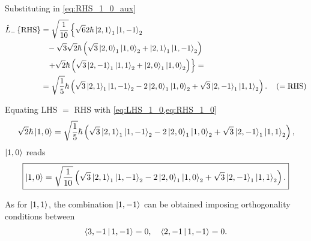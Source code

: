Substituting in \cref{eq:RHS_1_0_aux}
\begin{align}\label{eq:RHS_1_0}
    \notag
    \hat{L}_{-} \left\{ \text{RHS} \right\} &=
    \sqrt{\frac{1}{10}} \left\{
        \sqrt{6} 
        2 \hbar \Ket{2,1}_1 \Ket{1,-1}_2
        \right. \\
        \notag
        & \phantom{=}
        -\sqrt{3} 
        \sqrt{2} \hbar \left(
            \sqrt{3} \Ket{2,0}_1 \Ket{1,0}_2
            +
            \Ket{2,1}_1 \Ket{1,-1}_2
        \right)
        \\
        \notag
        & \phantom{=} \left.
        + 
        \sqrt{2} \hbar \left(
            \sqrt{3} \Ket{2,-1}_1 \Ket{1,1}_2
            +
            \Ket{2,0}_1 \Ket{1,0}_2
        \right)
    \right\}
    =
    \\
    &=
    \sqrt{\frac{1}{5}} \hbar \left(
        \sqrt{3} \Ket{2,1}_1 \Ket{1,-1}_2
        - 2 \Ket{2,0}_1 \Ket{1,0}_2 
        + \sqrt{3} \Ket{2,-1}_1 \Ket{1,1}_2
    \right).
    \quad \left( = \text{RHS} \right)
\end{align}

Equating LHS $=$ RHS with \cref{eq:LHS_1_0,eq:RHS_1_0} 
\begin{equation}
    \sqrt{2} \hbar \Ket{1,0} =
    \sqrt{\frac{1}{5}} \hbar \left(
        \sqrt{3} \Ket{2,1}_1 \Ket{1,-1}_2
        - 2 \Ket{2,0}_1 \Ket{1,0}_2 
        + \sqrt{3} \Ket{2,-1}_1 \Ket{1,1}_2
    \right),
\end{equation}
$\Ket{1,0}$ reads 
\begin{equation}
    \boxed{
        \Ket{1,0} =
        \sqrt{\frac{1}{10}} \left(
            \sqrt{3} \Ket{2,1}_1 \Ket{1,-1}_2
            - 2 \Ket{2,0}_1 \Ket{1,0}_2 
            + \sqrt{3} \Ket{2,-1}_1 \Ket{1,1}_2
        \right)
        .
    }
\end{equation}

As for $\Ket{1,1}$, the combination $\Ket{1,-1}$ can be obtained imposing orthogonality conditions between 
\begin{equation}\label{eq:orthog_cond_1_-1}
    \Braket{3,-1 | 1,-1} = 0 ,
    \quad
    \Braket{2,-1 | 1,-1} = 0.
\end{equation}

